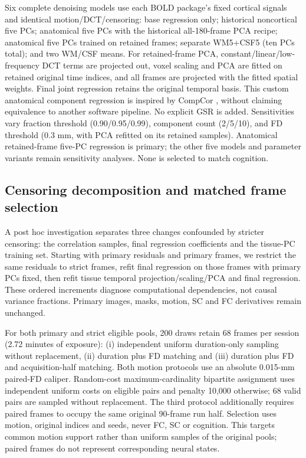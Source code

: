 \documentclass[11pt,a4paper]{article}
\begin{document}
Six complete denoising models use each BOLD package's fixed cortical signals and identical motion/DCT/censoring: base regression only; historical noncortical five PCs; anatomical five PCs with the historical all-180-frame PCA recipe; anatomical five PCs trained on retained frames; separate WM5+CSF5 (ten PCs total); and two WM/CSF means. For retained-frame PCA, constant/linear/low-frequency DCT terms are projected out, voxel scaling and PCA are fitted on retained original time indices, and all frames are projected with the fitted spatial weights. Final joint regression retains the original temporal basis. This custom anatomical component regression is inspired by CompCor \citep{behzadi2007}, without claiming equivalence to another software pipeline. No explicit GSR is added. Sensitivities vary fraction threshold (0.90/0.95/0.99), component count (2/5/10), and FD threshold (0.3 mm, with PCA refitted on its retained samples). Anatomical retained-frame five-PC regression is primary; the other five models and parameter variants remain sensitivity analyses. None is selected to match cognition.

\subsection{Censoring decomposition and matched frame selection}\label{sec:censoringmethod}
A post hoc investigation separates three changes confounded by stricter censoring: the correlation samples, final regression coefficients and the tissue-PC training set. Starting with primary residuals and primary frames, we restrict the same residuals to strict frames, refit final regression on those frames with primary PCs fixed, then refit tissue temporal projection/scaling/PCA and final regression. These ordered increments diagnose computational dependencies, not causal variance fractions. Primary images, masks, motion, SC and FC derivatives remain unchanged.

For both primary and strict eligible pools, 200 draws retain 68 frames per session (2.72 minutes of exposure): (i) independent uniform duration-only sampling without replacement, (ii) duration plus FD matching and (iii) duration plus FD and acquisition-half matching. Both motion protocols use an absolute 0.015-mm paired-FD caliper. Random-cost maximum-cardinality bipartite assignment uses independent uniform costs on eligible pairs and penalty 10,000 otherwise; 68 valid pairs are sampled without replacement. The third protocol additionally requires paired frames to occupy the same original 90-frame run half. Selection uses motion, original indices and seeds, never FC, SC or cognition. This targets common motion support rather than uniform samples of the original pools; paired frames do not represent corresponding neural states.
\end{document}
